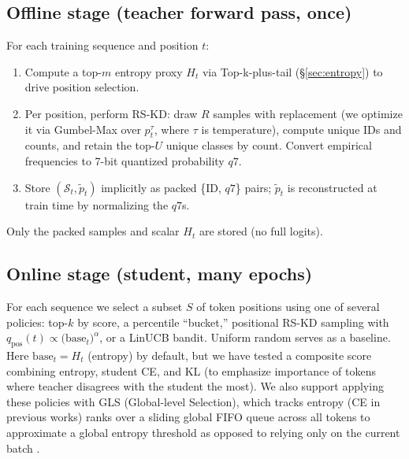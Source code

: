 \documentclass[11pt]{article}
\begin{document}
\subsection{Offline stage (teacher forward pass, once)}
For each training sequence and position $t$:
\begin{enumerate}
	\item Compute a top-$m$ entropy proxy $H_t$ via Top-k-plus-tail (\S\ref{sec:entropy}) to drive position selection.
	\item Per position, perform RS-KD: draw $R$ samples with replacement (we optimize it via Gumbel-Max over $p_t^\tau$, where $\tau$ is temperature), compute unique IDs and counts, and retain the top-$U$ unique classes by count.
	      Convert empirical frequencies to 7-bit quantized probability $q7$.
	\item Store $(\mathcal{S}_t,\tilde p_t)$ implicitly as packed \{ID, $q7$\} pairs; $\tilde p_t$ is reconstructed at train time by normalizing the $q7$s.
\end{enumerate}
Only the packed samples and scalar $H_t$ are stored (no full logits).

\subsection{Online stage (student, many epochs)}
For each sequence we select a subset $S$ of token positions using one of several policies:
top-$k$ by score, a percentile ``bucket,'' positional RS-KD sampling with $q_{\text{pos}}(t)\propto\big(\text{base}_t\big)^{\alpha}$, or a LinUCB bandit. Uniform random serves as a baseline.
Here $\text{base}_t=H_t$ (entropy) by default, but we have tested a composite score combining entropy, student CE, and KL (to emphasize importance of tokens where teacher disagrees with the student the most).
We also support applying these policies with GLS (Global-level Selection), which tracks entropy (CE in previous works) ranks over a sliding global FIFO queue across all tokens to approximate a global entropy threshold as opposed to relying only on the current batch \citep{wang2021selectivekd}.
\end{document}
